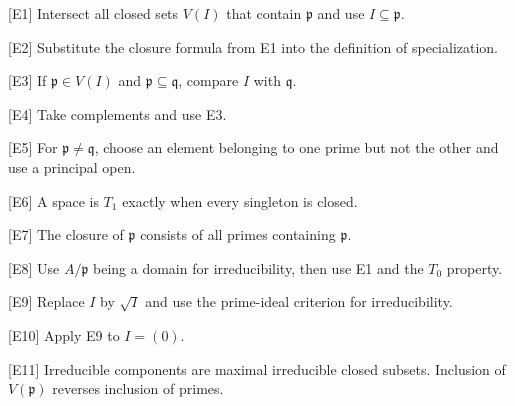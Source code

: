\begin{hint}
[E1]
Intersect all closed sets $V(I)$ that contain $\mathfrak p$ and use
$I\subseteq\mathfrak p$.
\end{hint}

\begin{hint}
[E2]
Substitute the closure formula from E1 into the definition of specialization.
\end{hint}

\begin{hint}
[E3]
If $\mathfrak p\in V(I)$ and $\mathfrak p\subseteq\mathfrak q$, compare $I$ with
$\mathfrak q$.
\end{hint}

\begin{hint}
[E4]
Take complements and use E3.
\end{hint}

\begin{hint}
[E5]
For $\mathfrak p\neq\mathfrak q$, choose an element belonging to one prime but not the
other and use a principal open.
\end{hint}

\begin{hint}
[E6]
A space is $T_1$ exactly when every singleton is closed.
\end{hint}

\begin{hint}
[E7]
The closure of $\mathfrak p$ consists of all primes containing $\mathfrak p$.
\end{hint}

\begin{hint}
[E8]
Use $A/\mathfrak p$ being a domain for irreducibility, then use E1 and the $T_0$ property.
\end{hint}

\begin{hint}
[E9]
Replace $I$ by $\sqrt I$ and use the prime-ideal criterion for irreducibility.
\end{hint}

\begin{hint}
[E10]
Apply E9 to $I=(0)$.
\end{hint}

\begin{hint}
[E11]
Irreducible components are maximal irreducible closed subsets.  Inclusion of $V(\mathfrak p)$
reverses inclusion of primes.
\end{hint}

